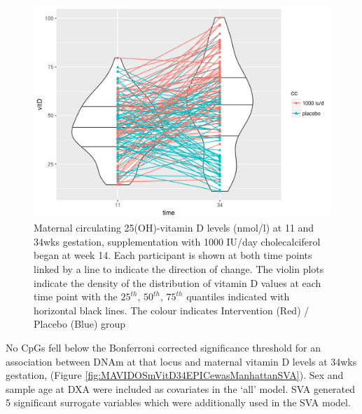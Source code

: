 \documentclass[
]{book}
\begin{document}
\begin{figure}

{\centering \includegraphics[width=0.8\linewidth]{figs/MAVIDOSvitDviolinMonApr162018} 

}

\caption{Maternal circulating 25(OH)-vitamin D levels (nmol/l) at 11 and 34wks gestation, supplementation with 1000 IU/day cholecalciferol began at week 14. Each participant is shown at both time points linked by a line to indicate the direction of change. The violin plots indicate the density of the distribution of vitamin D values at each time point with the \(25^{th}\), \(50^{th}\), \(75^{th}\) quantiles indicated with horizontal black lines. The colour indicates Intervention (Red) / Placebo (Blue) group}\label{fig:MAVIDOSvitDviolinMonApr162018}
\end{figure}



No CpGs fell below the Bonferroni corrected significance threshold for an association between DNAm at that locus and maternal vitamin D levels at 34wks gestation, (Figure \ref{fig:MAVIDOSmVitD34EPICewasManhattanSVA}).
Sex and sample age at DXA were included as covariates in the `all' model.
SVA generated 5 significant surrogate variables which were additionally used in the SVA model.
\end{document}
